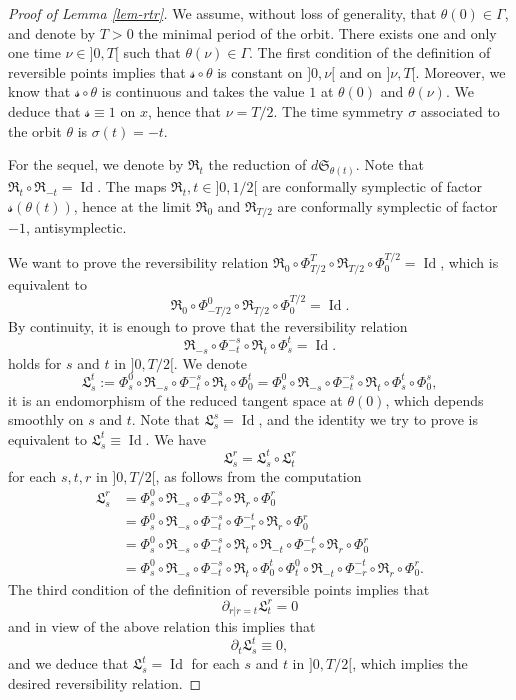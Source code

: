 \documentclass[JEP,XML,SOM,Unicode,published]{cedram}
\DeclareMathOperator{\Id}{Id}
\newcommand{\gL}{\ensuremath{\mathfrak{L}}}
\newcommand{\gR}{\ensuremath{\mathfrak{R}}}
\newcommand{\gS}{\ensuremath{\mathfrak{S}}}
\newcommand{\ms}{\ensuremath{\mathscr{s}}}
\theoremstyle{plain}
\theoremstyle{definition}
\begin{document}
\begin{proof}[Proof of Lemma \ref{lem-rtr}]
We assume, without loss of generality, that $\theta(0)\in \Gamma$, and denote by $T>0$ the minimal period of the orbit.
There exists one and only one time $\nu\in{}]0,T[$ such that $\theta (\nu)\in \Gamma$.
The first condition of the definition of reversible points implies that $ \ms\circ \theta$ is constant on $]0,\nu[$ and
on $]\nu,T[$. Moreover, we know that $\ms\circ \theta$ is continuous and takes the value $1$ at $\theta(0)$ and $\theta(\nu)$.
We deduce that $\ms\equiv 1$ on $x$, hence that $\nu=T/2$. The time symmetry $\sigma$ associated to the orbit $\theta$ is
$\sigma (t)=-t$.

For the sequel, we denote by $\gR_t$ the reduction of $d\gS_{\theta(t)}$. Note that $\gR_t\circ \gR_{-t}=\Id$.
The maps $\gR_t, t\in{}]0,1/2[$ are conformally symplectic of factor $\ms(\theta(t))$, hence at the limit $\gR_0$ and $\gR_{T/2}$
are conformally symplectic of factor $-1$, \ie antisymplectic.

We want to prove the reversibility relation
$
\gR_0\circ \Phi_{T/2}^T\circ \gR_{T/2}\circ \Phi_{0}^{T/2}=\Id
$,
which is equivalent to
\[
\gR_0\circ \Phi_{-T/2}^0\circ \gR_{T/2}\circ \Phi_{0}^{T/2}=\Id.
\]
By continuity, it is enough to prove that the reversibility relation
\[
\gR_{-s}\circ \Phi_{-t}^{-s}\circ\gR_{t}\circ \Phi_s^t=\Id.
\]
holds for $s$ and $t$ in $]0,T/2[$.
We denote
\[
\gL_s^t:=
\Phi_s^0 \circ
\gR_{-s}\circ \Phi_{-t}^{-s}\circ\gR_{t}\circ \Phi_0^t
=\Phi_s^0
\circ
\gR_{-s}\circ \Phi_{-t}^{-s}\circ\gR_{t}\circ \Phi_s^t\circ \Phi_0^s,
\]
it is an endomorphism of the reduced tangent space at $\theta(0)$, which depends smoothly on $s$ and $t$.
Note that $\gL_s^s=\Id$, and the identity we try to prove is equivalent to $\gL_s^t\equiv \Id$.
We have
\[
\gL_s^r=\gL_s^t\circ \gL_t^r
\]
for each $s,t,r$ in $]0,T/2[$, as follows from the computation
\begin{align*}
\gL_s^r
&= \Phi_s^0 \circ \gR_{-s}\circ \Phi_{-r}^{-s}\circ\gR_{r}\circ \Phi_0^r\\
&=\Phi_s^0 \circ \gR_{-s}\circ \Phi_{-t}^{-s}\circ \Phi_{-r}^{-t}\circ \gR_{r}\circ \Phi_0^r\\
&=\Phi_s^0 \circ \gR_{-s}\circ \Phi_{-t}^{-s}\circ \gR_t\circ \gR_{-t}\circ \Phi_{-r}^{-t}\circ \gR_{r}\circ \Phi_0^r\\
&=\Phi_s^0 \circ \gR_{-s}\circ \Phi_{-t}^{-s}\circ \gR_t\circ \Phi_0^t\circ \Phi_t^0\circ \gR_{-t}\circ \Phi_{-r}^{-t}\circ \gR_{r}\circ \Phi_0^r.
\end{align*}
The third condition of the definition of reversible points implies that
\[
\partial_{r|r=t}\gL_t^r=0\]
and in view of the above relation this implies that
\[
\partial_t \gL_s^t\equiv 0,\]
and we deduce that $\gL_s^t=\Id$ for each $s$ and $t$ in $]0,T/2[$, which implies the desired reversibility relation.
\end{proof}
\end{document}
